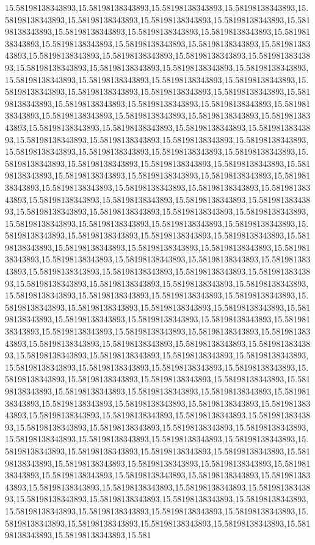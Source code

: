 15.58198138343893,15.58198138343893,15.58198138343893,15.58198138343893,15.58198138343893,15.58198138343893,15.58198138343893,15.58198138343893,15.58198138343893,15.58198138343893,15.58198138343893,15.58198138343893,15.58198138343893,15.58198138343893,15.58198138343893,15.58198138343893,15.58198138343893,15.58198138343893,15.58198138343893,15.58198138343893,15.58198138343893,15.58198138343893,15.58198138343893,15.58198138343893,15.58198138343893,15.58198138343893,15.58198138343893,15.58198138343893,15.58198138343893,15.58198138343893,15.58198138343893,15.58198138343893,15.58198138343893,15.58198138343893,15.58198138343893,15.58198138343893,15.58198138343893,15.58198138343893,15.58198138343893,15.58198138343893,15.58198138343893,15.58198138343893,15.58198138343893,15.58198138343893,15.58198138343893,15.58198138343893,15.58198138343893,15.58198138343893,15.58198138343893,15.58198138343893,15.58198138343893,15.58198138343893,15.58198138343893,15.58198138343893,15.58198138343893,15.58198138343893,15.58198138343893,15.58198138343893,15.58198138343893,15.58198138343893,15.58198138343893,15.58198138343893,15.58198138343893,15.58198138343893,15.58198138343893,15.58198138343893,15.58198138343893,15.58198138343893,15.58198138343893,15.58198138343893,15.58198138343893,15.58198138343893,15.58198138343893,15.58198138343893,15.58198138343893,15.58198138343893,15.58198138343893,15.58198138343893,15.58198138343893,15.58198138343893,15.58198138343893,15.58198138343893,15.58198138343893,15.58198138343893,15.58198138343893,15.58198138343893,15.58198138343893,15.58198138343893,15.58198138343893,15.58198138343893,15.58198138343893,15.58198138343893,15.58198138343893,15.58198138343893,15.58198138343893,15.58198138343893,15.58198138343893,15.58198138343893,15.58198138343893,15.58198138343893,15.58198138343893,15.58198138343893,15.58198138343893,15.58198138343893,15.58198138343893,15.58198138343893,15.58198138343893,15.58198138343893,15.58198138343893,15.58198138343893,15.58198138343893,15.58198138343893,15.58198138343893,15.58198138343893,15.58198138343893,15.58198138343893,15.58198138343893,15.58198138343893,15.58198138343893,15.58198138343893,15.58198138343893,15.58198138343893,15.58198138343893,15.58198138343893,15.58198138343893,15.58198138343893,15.58198138343893,15.58198138343893,15.58198138343893,15.58198138343893,15.58198138343893,15.58198138343893,15.58198138343893,15.58198138343893,15.58198138343893,15.58198138343893,15.58198138343893,15.58198138343893,15.58198138343893,15.58198138343893,15.58198138343893,15.58198138343893,15.58198138343893,15.58198138343893,15.58198138343893,15.58198138343893,15.58198138343893,15.58198138343893,15.58198138343893,15.58198138343893,15.58198138343893,15.58198138343893,15.58198138343893,15.58198138343893,15.58198138343893,15.58198138343893,15.58198138343893,15.58198138343893,15.58198138343893,15.58198138343893,15.58198138343893,15.58198138343893,15.58198138343893,15.58198138343893,15.58198138343893,15.58198138343893,15.58198138343893,15.58198138343893,15.58198138343893,15.58198138343893,15.58198138343893,15.58198138343893,15.58198138343893,15.58198138343893,15.58198138343893,15.58198138343893,15.58198138343893,15.58198138343893,15.58198138343893,15.58198138343893,15.58198138343893,15.58198138343893,15.58198138343893,15.58198138343893,15.58198138343893,15.581